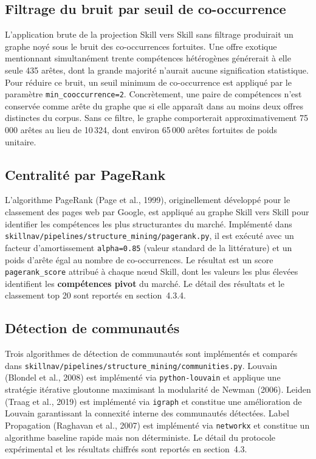 \documentclass[11pt,a4paper,openany]{report}
\begin{document}
\subsection{Filtrage du bruit par seuil de co-occurrence}

L'application brute de la projection Skill vers Skill sans filtrage produirait un graphe noy\'e sous le bruit des co-occurrences fortuites. Une offre exotique mentionnant simultan\'ement trente comp\'etences h\'et\'erog\`enes g\'en\'ererait \`a elle seule 435 ar\^etes, dont la grande majorit\'e n'aurait aucune signification statistique. Pour r\'eduire ce bruit, un seuil minimum de co-occurrence est appliqu\'e par le param\`etre \texttt{min\_cooccurrence=2}. Concr\`etement, une paire de comp\'etences n'est conserv\'ee comme ar\^ete du graphe que si elle appara\^it dans au moins deux offres distinctes du corpus. Sans ce filtre, le graphe comporterait approximativement 75\,000 ar\^etes au lieu de 10\,324, dont environ 65\,000 ar\^etes fortuites de poids unitaire.

\subsection{Centralit\'e par PageRank}

L'algorithme PageRank (Page et al., 1999), originellement d\'evelopp\'e pour le classement des pages web par Google, est appliqu\'e au graphe Skill vers Skill pour identifier les comp\'etences les plus structurantes du march\'e. Impl\'ement\'e dans \texttt{skillnav/pipelines/structure\_mining/pagerank.py}, il est ex\'ecut\'e avec un facteur d'amortissement \texttt{alpha=0.85} (valeur standard de la litt\'erature) et un poids d'ar\^ete \'egal au nombre de co-occurrences. Le r\'esultat est un score \texttt{pagerank\_score} attribu\'e \`a chaque n\oe ud Skill, dont les valeurs les plus \'elev\'ees identifient les \textbf{comp\'etences pivot} du march\'e. Le d\'etail des r\'esultats et le classement top 20 sont report\'es en section~4.3.4.

\subsection{D\'etection de communaut\'es}

Trois algorithmes de d\'etection de communaut\'es sont impl\'ement\'es et compar\'es dans \texttt{skillnav/pipelines/structure\_mining/communities.py}. Louvain (Blondel et al., 2008) est impl\'ement\'e via \texttt{python-louvain} et applique une strat\'egie it\'erative gloutonne maximisant la modularit\'e de Newman (2006). Leiden (Traag et al., 2019) est impl\'ement\'e via \texttt{igraph} et constitue une am\'elioration de Louvain garantissant la connexit\'e interne des communaut\'es d\'etect\'ees. Label Propagation (Raghavan et al., 2007) est impl\'ement\'e via \texttt{networkx} et constitue un algorithme baseline rapide mais non d\'eterministe. Le d\'etail du protocole exp\'erimental et les r\'esultats chiffr\'es sont report\'es en section~4.3.
\end{document}
